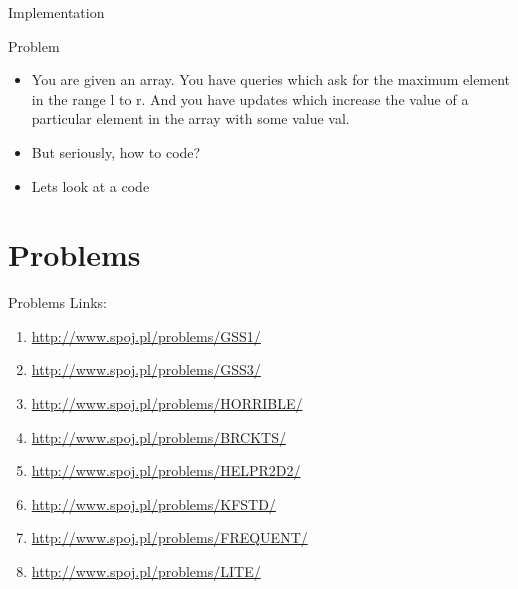 \documentclass{beamer}
\begin{document}
\begin{frame}[<+->]{Implementation}
\begin{block}{Problem}
    \begin{itemize}
	\item You are given an array. You have queries which ask for the maximum element in the range l to r. And you have updates which increase the value of a particular element in the array with some value val.
	\item But seriously, how to code?
	\item Lets look at a code
    \end{itemize}
\end{block}
\end{frame}

\section{Problems}

\begin{frame}{Problems}
Links:
\begin{enumerate}
\item \url{http://www.spoj.pl/problems/GSS1/}
\item \url{http://www.spoj.pl/problems/GSS3/}
\item \url{http://www.spoj.pl/problems/HORRIBLE/}
\item \url{http://www.spoj.pl/problems/BRCKTS/}
\item \url{http://www.spoj.pl/problems/HELPR2D2/}
\item \url{http://www.spoj.pl/problems/KFSTD/}
\item \url{http://www.spoj.pl/problems/FREQUENT/}
\item \url{http://www.spoj.pl/problems/LITE/}
\end{enumerate}
\end{frame}
\end{document}
